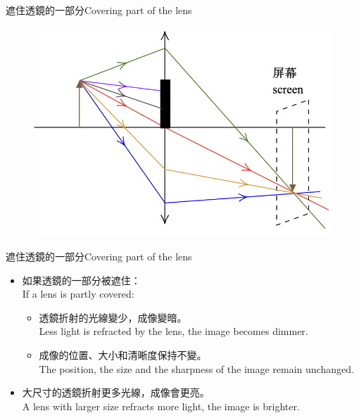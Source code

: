 \documentclass[beamer=true]{standalone}
\begin{document}
\begin{frame}{遮住透鏡的一部分Covering part of the lens}
    \begin{figure}
        \centering
        \includegraphics[width=0.75\linewidth]{../../assets/nud982u98u.png}


    \end{figure}
\end{frame}
\begin{frame}{遮住透鏡的一部分Covering part of the lens}
    \begin{itemize}
        \item 如果透鏡的一部分被遮住：\\If a lens is partly covered:
              \begin{itemize}
                  \item 透鏡折射的光線變少，成像變暗。\\Less light is refracted by the lens, the image becomes dimmer.
                  \item 成像的位置、大小和清晰度保持不變。\\The position, the size and the sharpness of the image remain unchanged.
              \end{itemize}
        \item 大尺寸的透鏡折射更多光線，成像會更亮。\\A lens with larger size refracts more light, the image is brighter.
    \end{itemize}
\end{frame}
\end{document}
